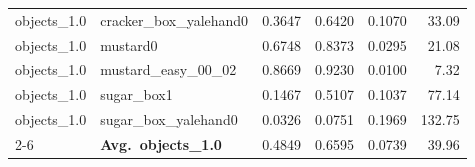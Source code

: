 \begin{longtable}{llrrrr}
  objects_1.0 & cracker\_box\_yalehand0 & 0.3647 & 0.6420 & 0.1070 & 33.09 \\
  objects_1.0 & mustard0 & 0.6748 & 0.8373 & 0.0295 & 21.08 \\
  objects_1.0 & mustard\_easy\_00\_02 & 0.8669 & 0.9230 & 0.0100 & 7.32 \\
  objects_1.0 & sugar\_box1 & 0.1467 & 0.5107 & 0.1037 & 77.14 \\
  objects_1.0 & sugar\_box\_yalehand0 & 0.0326 & 0.0751 & 0.1969 & 132.75 \\
  \cmidrule{2-6}
  & \textbf{Avg.~objects_1.0} & 0.4849 & 0.6595 & 0.0739 & 39.96 \\
  \midrule
\bottomrule
\end{longtable}